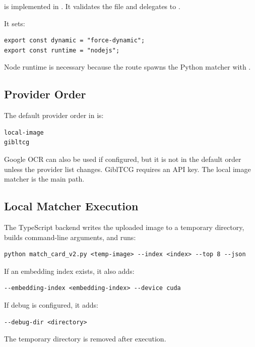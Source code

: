 \documentclass[11pt,a4paper]{article}
\begin{document}
 is implemented in . It validates the file and delegates to .

It sets:

\begin{lstlisting}
export const dynamic = "force-dynamic";
export const runtime = "nodejs";
\end{lstlisting}

Node runtime is necessary because the route spawns the Python matcher with .

\subsection{Provider Order}

The default provider order in  is:

\begin{lstlisting}
local-image
gibltcg
\end{lstlisting}

Google OCR can also be used if configured, but it is not in the default order unless the provider list changes. GiblTCG requires an API key. The local image matcher is the main path.

\subsection{Local Matcher Execution}

The TypeScript backend writes the uploaded image to a temporary directory, builds command-line arguments, and runs:

\begin{lstlisting}
python match_card_v2.py <temp-image> --index <index> --top 8 --json
\end{lstlisting}

If an embedding index exists, it also adds:

\begin{lstlisting}
--embedding-index <embedding-index> --device cuda
\end{lstlisting}

If debug is configured, it adds:

\begin{lstlisting}
--debug-dir <directory>
\end{lstlisting}

The temporary directory is removed after execution.
\end{document}
